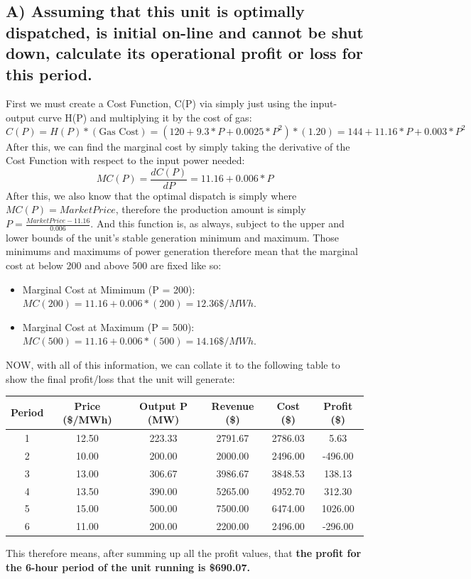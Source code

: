 \documentclass{article}
\begin{document}
\subsection{A) Assuming that this unit is optimally dispatched, is initial on-line and cannot be shut down, calculate its operational profit or loss for this period.}
First we must create a Cost Function, C(P) via simply just using the input-output curve H(P) and multiplying it by the cost of gas:
$$ C(P) = H(P) * (\text{Gas Cost}) = (120+9.3*P + 0.0025*P^2)*(1.20) = 144 + 11.16*P + 0.003*P^2$$
After this, we can find the marginal cost by simply taking the derivative of the Cost Function with respect to the input power needed:
$$ MC(P) = \frac{dC(P)}{dP} = 11.16 + 0.006*P $$
After this, we also know that the optimal dispatch is simply where $ MC(P) = Market Price $, therefore the production amount is simply $ P = \frac{Market Price - 11.16}{0.006} $. And this function is, as always, subject to the upper and lower bounds of the unit's stable generation minimum and maximum. Those minimums and maximums of power generation therefore mean that the marginal cost at below 200 and above 500 are fixed like so:
\begin{itemize}
	\item Marginal Cost at Mimimum (P = 200): $MC(200) = 11.16+0.006*(200) = 12.36\$/MWh$.
	\item Marginal Cost at Maximum (P = 500): $MC(500) = 11.16+0.006*(500) = 14.16\$/MWh$.
\end{itemize}
NOW, with all of this information, we can collate it to the following table to show the final profit/loss that the unit will generate:
\begin{center}
	\begin{tabular}{||c||c|c|c|c|c||}
		\hline
		Period & Price (\$/MWh) & Output P (MW) & Revenue (\$) & Cost (\$) & Profit (\$) \\
		\hline \hline
		1      & 12.50          & 223.33        & 2791.67      & 2786.03   & 5.63        \\
		\hline
		2      & 10.00          & 200.00        & 2000.00      & 2496.00   & -496.00     \\
		\hline
		3      & 13.00          & 306.67        & 3986.67      & 3848.53   & 138.13      \\
		\hline
		4      & 13.50          & 390.00        & 5265.00      & 4952.70   & 312.30      \\
		\hline
		5      & 15.00          & 500.00        & 7500.00      & 6474.00   & 1026.00     \\
		\hline
		6      & 11.00          & 200.00        & 2200.00      & 2496.00   & -296.00     \\
		\hline
	\end{tabular}
\end{center}
This therefore means, after summing up all the profit values, that \textbf{the profit for the 6-hour period of the unit running is \$690.07.}
\end{document}
